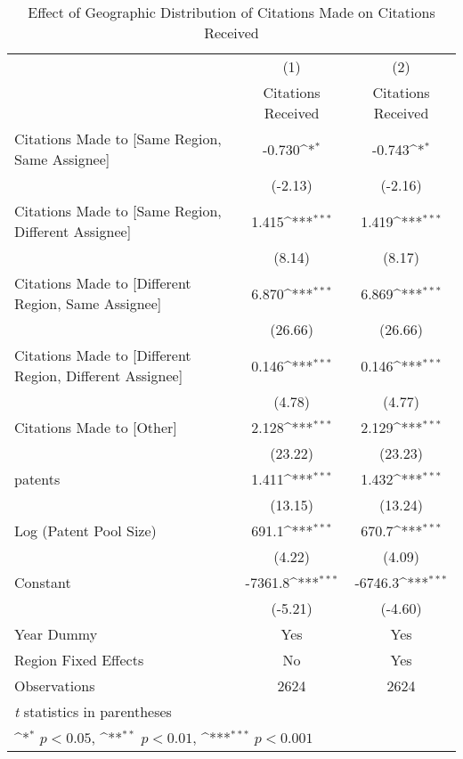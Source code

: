{
\def\sym#1{\ifmmode^{#1}\else\(^{#1}\)\fi}
\begin{longtable}{l*{2}{c}}
\caption{Effect of Geographic Distribution of Citations Made on Citations Received \label{eflowsreg}}\\
\hline\hline\endfirsthead\hline\endhead\hline\endfoot\endlastfoot
                    &\multicolumn{1}{c}{(1)}&\multicolumn{1}{c}{(2)}\\
                    &\multicolumn{1}{c}{Citations Received}&\multicolumn{1}{c}{Citations Received}\\
\hline
Citations Made to [Same Region, Same Assignee]&      -0.730\sym{*}  &      -0.743\sym{*}  \\
                    &     (-2.13)         &     (-2.16)         \\
[1em]
Citations Made to [Same Region, Different Assignee]&       1.415\sym{***}&       1.419\sym{***}\\
                    &      (8.14)         &      (8.17)         \\
[1em]
Citations Made to [Different Region, Same Assignee]&       6.870\sym{***}&       6.869\sym{***}\\
                    &     (26.66)         &     (26.66)         \\
[1em]
Citations Made to [Different Region, Different Assignee]&       0.146\sym{***}&       0.146\sym{***}\\
                    &      (4.78)         &      (4.77)         \\
[1em]
Citations Made to [Other]&       2.128\sym{***}&       2.129\sym{***}\\
                    &     (23.22)         &     (23.23)         \\
[1em]
patents             &       1.411\sym{***}&       1.432\sym{***}\\
                    &     (13.15)         &     (13.24)         \\
[1em]
Log (Patent Pool Size)&       691.1\sym{***}&       670.7\sym{***}\\
                    &      (4.22)         &      (4.09)         \\
[1em]
Constant            &     -7361.8\sym{***}&     -6746.3\sym{***}\\
                    &     (-5.21)         &     (-4.60)         \\
[1em]
Year Dummy          &         Yes         &         Yes         \\
[1em]
Region Fixed Effects  &          No         &         Yes         \\
\hline
Observations        &        2624         &        2624         \\
\hline\hline
\multicolumn{3}{l}{\footnotesize \textit{t} statistics in parentheses}\\
\multicolumn{3}{l}{\footnotesize \sym{*} \(p<0.05\), \sym{**} \(p<0.01\), \sym{***} \(p<0.001\)}\\
\end{longtable}
}
